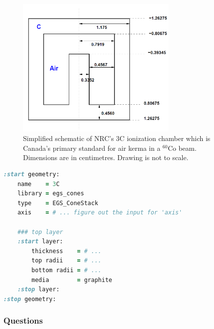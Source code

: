 \documentclass[12pt,twoside]{article}
\begin{document}
\begin{figure}[ht]
\includegraphics[width=0.7\textwidth]{figures/3C}
\caption{\label{fig:3C} Simplified schematic of NRC's 3C ionization chamber which
is Canada's primary standard for air kerma in a $^{60}$Co beam. Dimensions are in
centimetres. Drawing is not to scale.}
\end{figure}

\vspace{1ex}
{\small
\begin{lstlisting}[language=ruby,backgroundcolor=\color{white}]
:start geometry:
    name    = 3C
    library = egs_cones
    type    = EGS_ConeStack
    axis    = # ... figure out the input for 'axis'

    ### top layer
    :start layer:
        thickness    = # ...
        top radii    = # ...
        bottom radii = # ...
        media        = graphite
    :stop layer:
:stop geometry:
\end{lstlisting}
}

\subsubsection{Questions}
\end{document}
